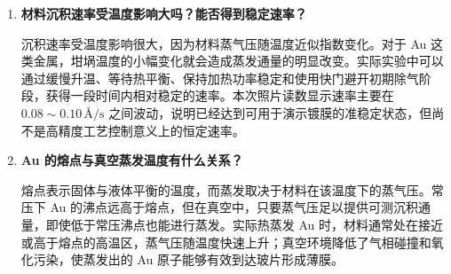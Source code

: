 \documentclass[11pt]{article}
\newcommand{\Ang}{\text{\AA}}
\begin{document}
\begin{enumerate}
    \item \textbf{材料沉积速率受温度影响大吗？能否得到稳定速率？}

    沉积速率受温度影响很大，因为材料蒸气压随温度近似指数变化。对于 Au 这类金属，坩埚温度的小幅变化就会造成蒸发通量的明显改变。实际实验中可以通过缓慢升温、等待热平衡、保持加热功率稳定和使用快门避开初期除气阶段，获得一段时间内相对稳定的速率。本次照片读数显示速率主要在 $0.08\sim0.10\,\Ang/\mathrm{s}$ 之间波动，说明已经达到可用于演示镀膜的准稳定状态，但尚不是高精度工艺控制意义上的恒定速率。

    \item \textbf{Au 的熔点与真空蒸发温度有什么关系？}

    熔点表示固体与液体平衡的温度，而蒸发取决于材料在该温度下的蒸气压。常压下 Au 的沸点远高于熔点，但在真空中，只要蒸气压足以提供可测沉积通量，即使低于常压沸点也能进行蒸发。实际热蒸发 Au 时，材料通常处在接近或高于熔点的高温区，蒸气压随温度快速上升；真空环境降低了气相碰撞和氧化污染，使蒸发出的 Au 原子能够有效到达玻片形成薄膜。
\end{enumerate}
\end{document}
